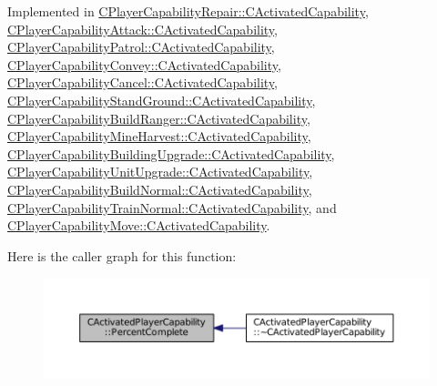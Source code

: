 Implemented in \hyperlink{classCPlayerCapabilityRepair_1_1CActivatedCapability_a88276fec60e08b56daecfd14b36fe888}{C\+Player\+Capability\+Repair\+::\+C\+Activated\+Capability}, \hyperlink{classCPlayerCapabilityAttack_1_1CActivatedCapability_a75866109b62de0522622b03137461519}{C\+Player\+Capability\+Attack\+::\+C\+Activated\+Capability}, \hyperlink{classCPlayerCapabilityPatrol_1_1CActivatedCapability_a868e6583a55b01e5aa3b926ef14677bc}{C\+Player\+Capability\+Patrol\+::\+C\+Activated\+Capability}, \hyperlink{classCPlayerCapabilityConvey_1_1CActivatedCapability_aec6b75fc004f4ac18755d8f601c8ffca}{C\+Player\+Capability\+Convey\+::\+C\+Activated\+Capability}, \hyperlink{classCPlayerCapabilityCancel_1_1CActivatedCapability_a69d2fec27186cba11ab545560e7bf45d}{C\+Player\+Capability\+Cancel\+::\+C\+Activated\+Capability}, \hyperlink{classCPlayerCapabilityStandGround_1_1CActivatedCapability_aa9bf1824e755460b699d81f866f2aadc}{C\+Player\+Capability\+Stand\+Ground\+::\+C\+Activated\+Capability}, \hyperlink{classCPlayerCapabilityBuildRanger_1_1CActivatedCapability_a2e1c0859b129404fe1cc65bcdb187bad}{C\+Player\+Capability\+Build\+Ranger\+::\+C\+Activated\+Capability}, \hyperlink{classCPlayerCapabilityMineHarvest_1_1CActivatedCapability_ac198166a008306dc543ceed94baaf4a3}{C\+Player\+Capability\+Mine\+Harvest\+::\+C\+Activated\+Capability}, \hyperlink{classCPlayerCapabilityBuildingUpgrade_1_1CActivatedCapability_afb2aab171773fa9f33539e33315c1c28}{C\+Player\+Capability\+Building\+Upgrade\+::\+C\+Activated\+Capability}, \hyperlink{classCPlayerCapabilityUnitUpgrade_1_1CActivatedCapability_a16026f30b1ec10fbd4cb7049d0b74719}{C\+Player\+Capability\+Unit\+Upgrade\+::\+C\+Activated\+Capability}, \hyperlink{classCPlayerCapabilityBuildNormal_1_1CActivatedCapability_a40bf27f9dfe88ad17a51ebb12c078568}{C\+Player\+Capability\+Build\+Normal\+::\+C\+Activated\+Capability}, \hyperlink{classCPlayerCapabilityTrainNormal_1_1CActivatedCapability_ac0d2dd8e1b3aedb0873149ba4c92e6f7}{C\+Player\+Capability\+Train\+Normal\+::\+C\+Activated\+Capability}, and \hyperlink{classCPlayerCapabilityMove_1_1CActivatedCapability_a1696dd16d89d0978284a95dd1531d0d5}{C\+Player\+Capability\+Move\+::\+C\+Activated\+Capability}.

Here is the caller graph for this function\+:\nopagebreak
\begin{figure}[H]
\begin{center}
\leavevmode
\includegraphics[width=350pt]{classCActivatedPlayerCapability_a405dc6076058006a4f801727de4cfe4d_icgraph}
\end{center}
\end{figure}


